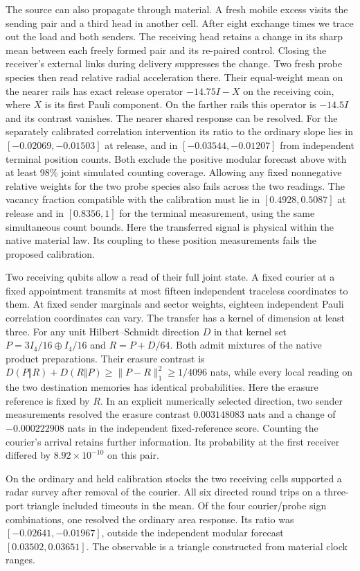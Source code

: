 \documentclass[11pt]{article}
\begin{document}
The source can also propagate through material. A fresh mobile excess visits
the sending pair and a third head in another cell. After eight exchange times
we trace out the load and both senders. The receiving head retains a change
in its sharp mean between each freely formed pair and its re-paired control.
Closing the receiver's external links during delivery suppresses the change.
Two fresh probe species then read relative radial acceleration there. Their
equal-weight mean on the nearer rails has exact release operator
$-14.75I-X$ on the receiving coin, where $X$ is its first Pauli component.
On the farther rails this operator is $-14.5I$ and its contrast vanishes.
The nearer shared response can be resolved. For the separately calibrated
correlation intervention its ratio to the ordinary slope lies in
$[-0.02069,-0.01503]$ at release, and in $[-0.03544,-0.01207]$ from
independent terminal position counts. Both exclude the positive modular
forecast above with at least 98\% joint simulated counting coverage.
Allowing any fixed nonnegative relative weights for the two probe species
also fails across the two readings. The vacancy fraction compatible with
the calibration must lie in $[0.4928,0.5087]$ at release and in $[0.8356,1]$
for the terminal measurement, using the same simultaneous count bounds.
Here the transferred signal is physical within the native material law.
Its coupling to these position measurements fails the proposed calibration.

Two receiving qubits allow a read of their full joint state. A fixed
courier at a fixed appointment transmits at most fifteen independent
traceless coordinates to them. At fixed sender marginals and sector
weights, eighteen independent Pauli correlation coordinates can vary.
The transfer has a kernel of dimension at least three. For any unit
Hilbert--Schmidt direction $D$ in that kernel set
$P=3I_4/16\oplus I_4/16$ and $R=P+D/64$. Both admit mixtures of the
native product preparations. Their erasure contrast is
$D(P\Vert R)+D(R\Vert P)\ge\|P-R\|_1^2\ge1/4096$ nats, while every
local reading on the two destination memories has identical probabilities.
Here the erasure reference is fixed by $R$.
In an explicit numerically selected direction, two sender measurements
resolved the erasure contrast $0.003148083$ nats and a change of
$-0.000222908$ nats in the independent fixed-reference score.
Counting the courier's arrival retains further information. Its probability
at the first receiver differed by $8.92\times10^{-10}$ on this pair.

On the ordinary and held calibration stocks the two receiving cells
supported a radar survey after removal of the courier. All six directed
round trips on a three-port triangle included timeouts in the mean.
Of the four courier/probe sign combinations, one resolved the ordinary
area response. Its ratio was $[-0.02641,-0.01967]$, outside the
independent modular forecast $[0.03502,0.03651]$. The observable is a
triangle constructed from material clock ranges.
\end{document}
